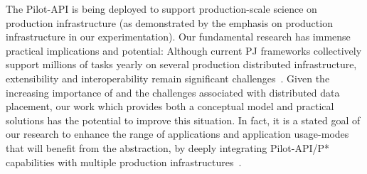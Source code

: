 \documentclass[conference]{IEEEtran}
\begin{document}
The Pilot-API is being deployed to support production-scale science on
production infrastructure (as demonstrated by the emphasis on
production infrastructure in our experimentation).  Our fundamental
research has immense practical implications and potential: Although
current PJ frameworks collectively support millions of tasks yearly on
several production distributed infrastructure, extensibility and
interoperability remain significant challenges~\cite{extenci}.  Given
the increasing importance of \pilotjobs and the challenges associated
with distributed data placement, our work which provides both a
conceptual model and practical solutions has the potential to improve
this situation.  In fact, it is a stated goal of our research to
enhance the range of applications and application usage-modes that
will benefit from the \pilot abstraction, by deeply integrating
Pilot-API/P* capabilities with multiple production
infrastructures~\cite{bigjob_web}.








\end{document}
